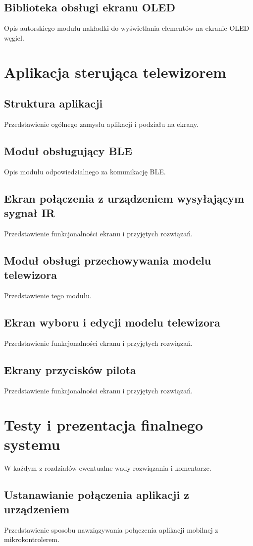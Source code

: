 \documentclass[12pt,twoside]{article}
\begin{document}
\subsection{Biblioteka obsługi ekranu OLED}
Opis autorskiego modułu-nakładki do wyświetlania elementów na ekranie OLED węgiel.
\clearpage

\section{Aplikacja sterująca telewizorem}
\subsection{Struktura aplikacji}
Przedstawienie ogólnego zamysłu aplikacji i podziału na ekrany.
\subsection{Moduł obsługujący BLE}
Opis modułu odpowiedzialnego za komunikację BLE.
\subsection{Ekran połączenia z urządzeniem wysyłającym sygnał IR}
Przedstawienie funkcjonalności ekranu i przyjętych rozwiązań.
\subsection{Moduł obsługi przechowywania modelu telewizora}
Przedstawienie tego modułu.
\subsection{Ekran wyboru i edycji modelu telewizora}
Przedstawienie funkcjonalności ekranu i przyjętych rozwiązań.
\subsection{Ekrany przycisków pilota}
Przedstawienie funkcjonalności ekranu i przyjętych rozwiązań.
\clearpage

\section{Testy i prezentacja finalnego systemu}
W każdym z rozdziałów ewentualne wady rozwiązania i komentarze.
\subsection{Ustanawianie połączenia aplikacji z urządzeniem}
Przedstawienie sposobu nawziązywania połączenia aplikacji mobilnej z mikrokontrolerem.
\end{document}
